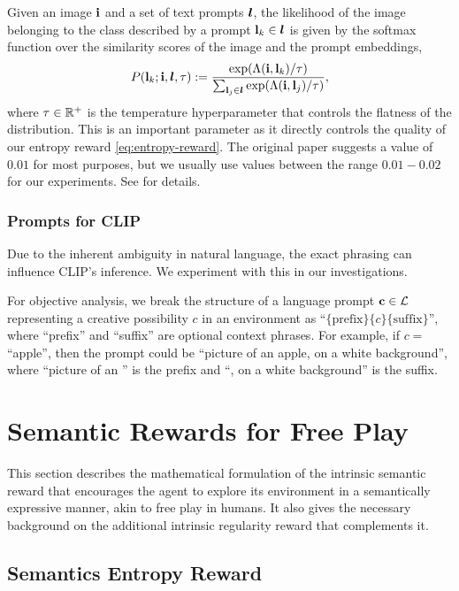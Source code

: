 Given an image \(\mathbf{i}\) and a set of text prompts \(\bm{l}\), the likelihood of the image belonging to the class described by a prompt \(\mathbf{l}_k \in \bm{l}\) is given by the softmax function over the similarity scores of the image and the prompt embeddings,
\begin{equation}
    \label{eq:clip-dist}
    P(\mathbf{l}_k; \mathbf{i}, \bm{l}, \tau) := \dfrac{\exp(\Lambda(\mathbf{i}, \mathbf{l}_k)/\tau)}{\sum_{\mathbf{l}_j \in \bm{l}} \exp(\Lambda(\mathbf{i}, \mathbf{l}_j)/\tau)},
\end{equation}
where \(\tau \in \mathbb{R}^+\) is the temperature hyperparameter that controls the flatness of the distribution.
This is an important parameter as it directly controls the quality of our entropy reward \eqref{eq:entropy-reward}.
The original paper suggests a value of \(0.01\) for most purposes, but we usually use values between the range \(0.01 - 0.02\) for our experiments.
See  for details.

\subsubsection{Prompts for CLIP}
\label{sec:prompt-engineering}
Due to the inherent ambiguity in natural language, the exact phrasing can influence CLIP's inference.
We experiment with this in our investigations.

For objective analysis, we break the structure of a language prompt \(\mathbf{c} \in \mathcal{L}\) representing a creative possibility \(c\) in an environment as ``\(\{\text{prefix}\}\{c\}\{\text{suffix}\}\)'', where ``prefix'' and ``suffix'' are optional context phrases. For example, if \(c =\) ``apple'', then the prompt could be ``picture of an apple, on a white background'', where ``picture of an '' is the prefix and ``, on a white background'' is the suffix.

\section{Semantic Rewards for Free Play}
\label{sec:semantics-reward}
This section describes the mathematical formulation of the intrinsic semantic reward that encourages the agent to explore its environment in a semantically expressive manner, akin to free play in humans.
It also gives the necessary background on the additional intrinsic regularity reward that complements it.

\subsection{Semantics Entropy Reward}
\label{sec:entropy-reward}

